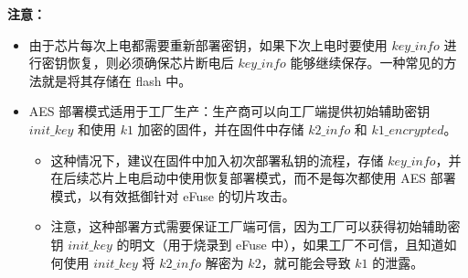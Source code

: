 \documentclass[main\_\_CN.tex]{subfiles}
\begin{document}
\textbf{注意：}\\
\begin{itemize}
    \item 由于芯片每次上电都需要重新部署密钥，如果下次上电时要使用 \hyperref[para:keyinfo]{\begin{math}key\_info\end{math}} 进行密钥恢复，则必须确保芯片断电后 \hyperref[para:keyinfo]{\begin{math}key\_info\end{math}} 能够继续保存。一种常见的方法就是将其存储在 flash 中。
    \item AES 部署模式适用于工厂生产：生产商可以向工厂端提供初始辅助密钥 \hyperref[para:initkey]{\begin{math}init\_key\end{math}}
    和使用 \hyperref[para:k1]{\begin{math}k1\end{math}} 加密的固件，并在固件中存储 \hyperref[para:k2info]{\begin{math}k2\_info\end{math}} 和 \hyperref[para:k1enc]{\begin{math}k1\_encrypted\end{math}}。
    \begin{itemize}
        \item 这种情况下，建议在固件中加入初次部署私钥的流程，存储 \hyperref[para:keyinfo]{\begin{math}key\_info\end{math}}，并在后续芯片上电启动中使用恢复部署模式，而不是每次都使用 AES 部署模式，以有效抵御针对 eFuse 的切片攻击。
        \item 注意，这种部署方式需要保证工厂端可信，因为工厂可以获得初始辅助密钥 \hyperref[para:initkey]{\begin{math}init\_key\end{math}} 的明文（用于烧录到 eFuse 中），如果工厂不可信，且知道如何使用 \hyperref[para:initkey]{\begin{math}init\_key\end{math}} 将 \hyperref[para:k2info]{\begin{math}k2\_info\end{math}} 解密为 \hyperref[para:k2]{\begin{math}k2\end{math}}，就可能会导致 \hyperref[para:k1]{\begin{math}k1\end{math}} 的泄露。
    \end{itemize}

\end{itemize}
\end{document}
